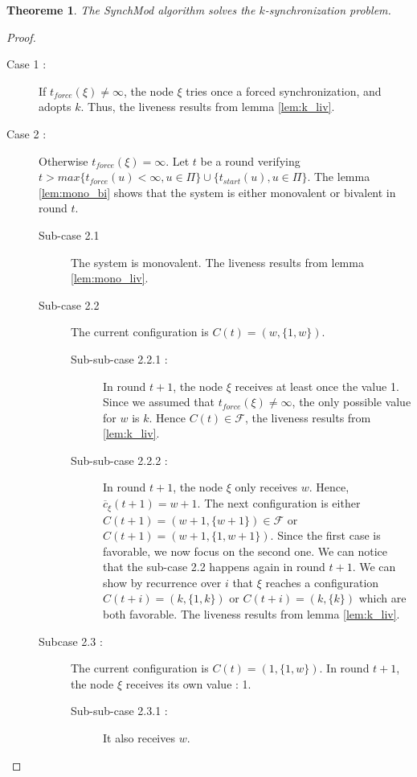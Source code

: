 \documentclass{article}
\newtheorem{theorem}{Theoreme}
\begin{document}
\begin{theorem}
	The SynchMod algorithm solves the $k$-synchronization problem.
\end{theorem}
\begin{proof}
	\begin{description}
		\item[Case 1 : ] If $t_{force}(\xi) \neq \infty$, the node $\xi$ tries once a forced synchronization, and adopts $k$.
			Thus, the liveness results from lemma \ref{lem:k_liv}.

		\item[Case 2 :] Otherwise $t_{force}(\xi) = \infty$.
			Let $t$ be a round verifying $t > max \{t_{force}(u) < \infty, u \in \Pi\} \cup \{t_{start}(u), u \in \Pi\}$.
			The lemma \ref{lem:mono_bi} shows that the system is either monovalent or bivalent in round $t$.
			\begin{description}
				\item[Sub-case 2.1] The system is monovalent. The liveness results from lemma \ref{lem:mono_liv}.
				\item[Sub-case 2.2] The current configuration is $C(t) = (w, \{1, w\})$.
					\begin{description}
						\item[Sub-sub-case 2.2.1 : ] In round $t+1$, the node $\xi$ receives at least once
							the value 1.
							Since we assumed that $t_{force}(\xi) \neq \infty$, the only possible value for $w$ is $k$.
							Hence $C(t) \in \mathcal{F}$, the liveness results from \ref{lem:k_liv}.
						\item[Sub-sub-case 2.2.2 : ] In round $t+1$, the node $\xi$ only receives $w$.
							Hence, $\overline{c}_\xi(t+1) = w+1$.
							The next configuration is either $C(t+1) = (w+1, \{w+1\}) \in \mathcal{F}$ or $C(t+1) = (w+1, \{1, w+1\})$.
							Since the first case is favorable, we now focus on the second one.
							We can notice that the sub-case 2.2 happens again in round $t+1$.
							We can show by recurrence over $i$ that $\xi$ reaches a configuration $C(t+i) = (k, \{1, k\})$ or $C(t+i) = (k, \{k\})$ which are both favorable.
							The liveness results from lemma \ref{lem:k_liv}.
					\end{description}
				\item[Subcase 2.3 : ] The current configuration is $C(t) = (1, \{1, w\})$.
					In round $t+1$, the node $\xi$ receives its own value : 1.
					\begin{description}
						\item[Sub-sub-case 2.3.1 : ] It also receives $w$.

\end{description}
\end{description}
\end{description}
\end{proof}
\end{document}
